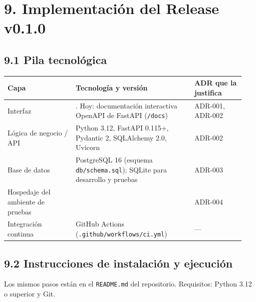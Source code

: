 \section{9. Implementación del Release
v0.1.0}\label{implementaciuxf3n-del-release-v0.1.0}

\subsection{9.1 Pila tecnológica}\label{pila-tecnoluxf3gica}

{\small
\begin{longtable}{@{}L{0.27\linewidth}L{0.47\linewidth}L{0.2\linewidth}@{}}
\toprule
\textbf{Capa} & \textbf{Tecnología y versión} & \textbf{ADR que la justifica} \\
\midrule
\endhead
\bottomrule
\endlastfoot
Interfaz & . Hoy: documentación interactiva OpenAPI de FastAPI
(\texttt{/docs}) & ADR-001, ADR-002 \\
Lógica de negocio / API & Python 3.12, FastAPI 0.115+, Pydantic 2, SQLAlchemy 2.0, Uvicorn & ADR-002 \\
Base de datos & PostgreSQL 16 (esquema \texttt{db/schema.sql}); SQLite para desarrollo y pruebas & ADR-003 \\
Hospedaje del ambiente de pruebas &  & ADR-004 \\
Integración continua & GitHub Actions (\texttt{.github/workflows/ci.yml}) & --- \\
\end{longtable}
}

\subsection{9.2 Instrucciones de instalación y
ejecución}\label{instrucciones-de-instalaciuxf3n-y-ejecuciuxf3n}

Los mismos pasos están en el \texttt{README.md} del repositorio. Requisitos: Python 3.12 o superior y Git.

